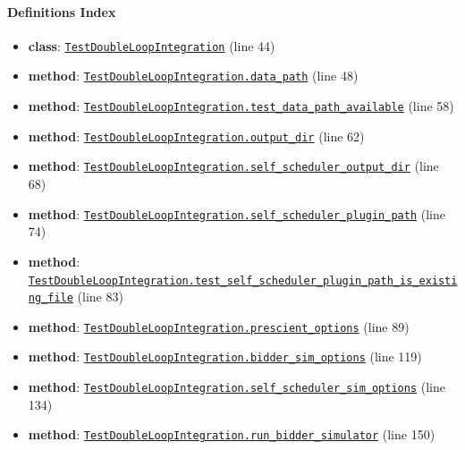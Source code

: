 \documentclass[11pt]{report}
\begin{document}
\paragraph{Definitions Index}
\begin{itemize}[leftmargin=*]
  \item \textbf{class}: \hyperref[def:tests-test_integration.py:TestDoubleLoopIntegration:L44]{\texttt{TestDoubleLoopIntegration}} (line 44)
  \item \textbf{method}: \hyperref[def:tests-test_integration.py:TestDoubleLoopIntegration.data_path:L48]{\texttt{TestDoubleLoopIntegration.data\_path}} (line 48)
  \item \textbf{method}: \hyperref[def:tests-test_integration.py:TestDoubleLoopIntegration.test_data_path_available:L58]{\texttt{TestDoubleLoopIntegration.test\_data\_path\_available}} (line 58)
  \item \textbf{method}: \hyperref[def:tests-test_integration.py:TestDoubleLoopIntegration.output_dir:L62]{\texttt{TestDoubleLoopIntegration.output\_dir}} (line 62)
  \item \textbf{method}: \hyperref[def:tests-test_integration.py:TestDoubleLoopIntegration.self_scheduler_output_dir:L68]{\texttt{TestDoubleLoopIntegration.self\_scheduler\_output\_dir}} (line 68)
  \item \textbf{method}: \hyperref[def:tests-test_integration.py:TestDoubleLoopIntegration.self_scheduler_plugin_path:L74]{\texttt{TestDoubleLoopIntegration.self\_scheduler\_plugin\_path}} (line 74)
  \item \textbf{method}: \hyperref[def:tests-test_integration.py:TestDoubleLoopIntegration.test_self_scheduler_plugin_path_is_existing_file:L83]{\texttt{TestDoubleLoopIntegration.test\_self\_scheduler\_plugin\_path\_is\_existing\_file}} (line 83)
  \item \textbf{method}: \hyperref[def:tests-test_integration.py:TestDoubleLoopIntegration.prescient_options:L89]{\texttt{TestDoubleLoopIntegration.prescient\_options}} (line 89)
  \item \textbf{method}: \hyperref[def:tests-test_integration.py:TestDoubleLoopIntegration.bidder_sim_options:L119]{\texttt{TestDoubleLoopIntegration.bidder\_sim\_options}} (line 119)
  \item \textbf{method}: \hyperref[def:tests-test_integration.py:TestDoubleLoopIntegration.self_scheduler_sim_options:L134]{\texttt{TestDoubleLoopIntegration.self\_scheduler\_sim\_options}} (line 134)
  \item \textbf{method}: \hyperref[def:tests-test_integration.py:TestDoubleLoopIntegration.run_bidder_simulator:L150]{\texttt{TestDoubleLoopIntegration.run\_bidder\_simulator}} (line 150)

\end{itemize}
\end{document}
